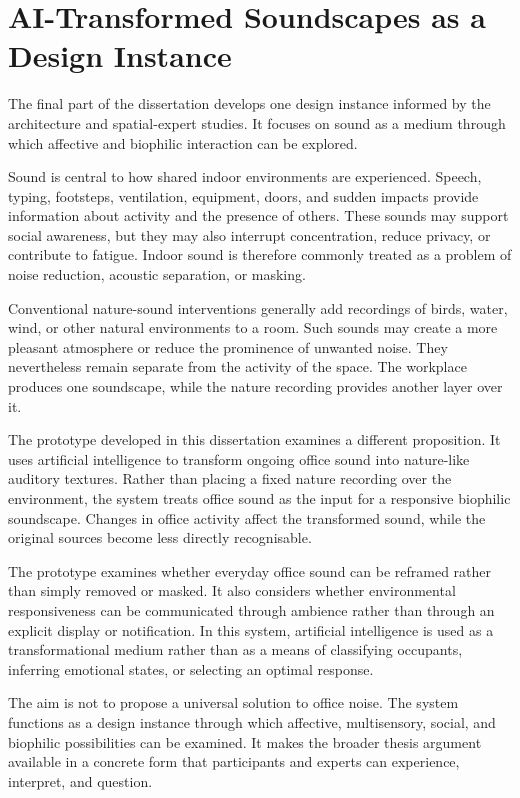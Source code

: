 \section{AI-Transformed Soundscapes as a Design Instance}

The final part of the dissertation develops one design instance informed by the architecture and spatial-expert studies. It focuses on sound as a medium through which affective and biophilic interaction can be explored.

Sound is central to how shared indoor environments are experienced. Speech, typing, footsteps, ventilation, equipment, doors, and sudden impacts provide information about activity and the presence of others. These sounds may support social awareness, but they may also interrupt concentration, reduce privacy, or contribute to fatigue. Indoor sound is therefore commonly treated as a problem of noise reduction, acoustic separation, or masking.

Conventional nature-sound interventions generally add recordings of birds, water, wind, or other natural environments to a room. Such sounds may create a more pleasant atmosphere or reduce the prominence of unwanted noise. They nevertheless remain separate from the activity of the space. The workplace produces one soundscape, while the nature recording provides another layer over it.

The prototype developed in this dissertation examines a different proposition. It uses artificial intelligence to transform ongoing office sound into nature-like auditory textures. Rather than placing a fixed nature recording over the environment, the system treats office sound as the input for a responsive biophilic soundscape. Changes in office activity affect the transformed sound, while the original sources become less directly recognisable.

The prototype examines whether everyday office sound can be reframed rather than simply removed or masked. It also considers whether environmental responsiveness can be communicated through ambience rather than through an explicit display or notification. In this system, artificial intelligence is used as a transformational medium rather than as a means of classifying occupants, inferring emotional states, or selecting an optimal response.

The aim is not to propose a universal solution to office noise. The system functions as a design instance through which affective, multisensory, social, and biophilic possibilities can be examined. It makes the broader thesis argument available in a concrete form that participants and experts can experience, interpret, and question.

